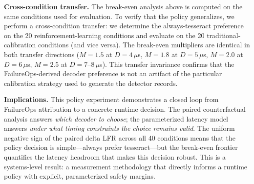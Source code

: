 \textbf{Cross-condition transfer.} The break-even analysis above is computed on the same conditions used for evaluation. To verify that the policy generalizes, we perform a cross-condition transfer: we determine the always-tesseract preference on the 20 reinforcement-learning conditions and evaluate on the 20 traditional-calibration conditions (and vice versa). The break-even multipliers are identical in both transfer directions ($M=1.5$ at $D=4$\,$\mu$s, $M=1.8$ at $D=5$\,$\mu$s, $M=2.0$ at $D=6$\,$\mu$s, $M=2.5$ at $D=7$--$8$\,$\mu$s). This transfer invariance confirms that the FailureOps-derived decoder preference is not an artifact of the particular calibration strategy used to generate the detector records.

\textbf{Implications.} This policy experiment demonstrates a closed loop from FailureOps attribution to a concrete runtime decision. The paired counterfactual analysis answers \emph{which decoder to choose}; the parameterized latency model answers \emph{under what timing constraints the choice remains valid}. The uniform negative sign of the paired delta LFR across all 40 conditions means that the policy decision is simple---always prefer tesseract---but the break-even frontier quantifies the latency headroom that makes this decision robust. This is a systems-level result: a measurement methodology that directly informs a runtime policy with explicit, parameterized safety margins.
